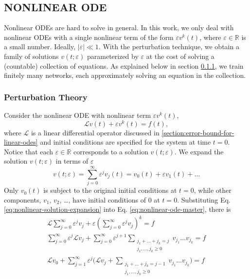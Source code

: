 \documentclass{uai2023}
\renewcommand{\L}{\mathcal{L}}
\begin{document}
\subsection{NONLINEAR ODE}
    Nonlinear ODEs are hard to solve in general. 
    In this work, we only deal with nonlinear ODEs with a single nonlinear term of the form $\varepsilon v^k(t)$, where $\varepsilon \in \mathbb{R}$ is a small number. 
    Ideally, $|\varepsilon| \ll 1$. 
    With the perturbation technique, we obtain a family of solutions $v(t;\varepsilon)$ parameterized by $\varepsilon$ at the cost of solving a (countable) collection of equations. 
    As explained below in section \ref{section:perturbation-theory}, we train finitely many networks, each approximately solving an equation in the collection.

\subsubsection{Perturbation Theory} \label{section:perturbation-theory}
    Consider the nonlinear ODE with nonlinear term $\varepsilon v^k(t)$,
    {
        \small
        \begin{equation} \label{eq:nonlinear-ode-master}
            \L v(t) + \varepsilon v^k(t) = f(t),
        \end{equation}
    }
    where $\L$ is a linear differential operator discussed in \ref{section:error-bound-for-linear-odes} and initial conditions are specified for the system at time $t=0$. 
    Notice that each $\varepsilon \in \mathbb{R}$ corresponds to a solution $v(t; \varepsilon)$. 
    We expand the solution $v(t; \varepsilon)$ in terms of $\varepsilon$
    {   
        \small
        \begin{equation} \label{eq:nonlinear-solution-expansion}
            v(t; \varepsilon) = \sum_{j=0}^{\infty} \varepsilon^j v_j(t) = v_0(t) + \varepsilon v_1(t) + \dots
        \end{equation}
    }
    Only $v_0(t)$ is subject to the original initial conditions at $t=0$, while other components, $v_1$, $v_2$, \dots, have initial conditions of $0$ at $t=0$.
    Substituting Eq. \ref{eq:nonlinear-solution-expansion} into Eq. \ref{eq:nonlinear-ode-master}, there is
    {
        \small
        \begin{gather}
            \L \sum_{j=0}^{\infty} \varepsilon^j v_j + \varepsilon \left(\sum_{j=0}^{\infty} \varepsilon^j v_j\right)^k = f \\
            \sum_{j=0}^{\infty} \varepsilon^j \L v_j + \sum_{j=0}^{\infty} \varepsilon^{j+1} \sum_{\substack{j_1+\dots+j_k = j\\j_1, \dots, j_k \geq 0}}v_{j_1}\dots v_{j_k} = f \\[-0.5em]
            \L v_0 + \sum_{j=1}^{\infty} \varepsilon^j \Bigg(\L v_j + \sum_{\substack{j_1+\dots+j_k = j - 1\\j_1, \dots, j_k \geq 0}}v_{j_1}\dots v_{j_k}\Bigg)= f \label{eq:nonlinear-equation-expansion} 
        \end{gather}
    }
\end{document}
